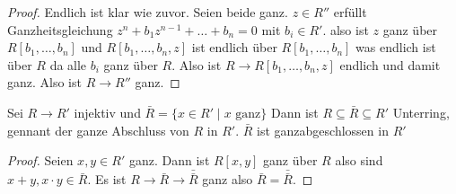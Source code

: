 \begin{proof}
	Endlich ist klar wie zuvor. Seien beide ganz.
	\(z\in R''\) erfüllt Ganzheitsgleichung \(z^n+b_1z^{n-1}+\dots+b_n=0\) mit \(b_i\in R'\).
	also ist \(z\) ganz über \(R[b_1,\dots,b_n]\) und \(R[b_1,\dots,b_n,z]\) ist endlich über \(R[b_1,\dots,b_n]\) was endlich ist über \(R\) da alle \(b_i\) ganz über \(R\). Also ist \(R\to R[b_1,\dots,b_n,z]\) endlich und damit ganz.
	Also ist \(R\to R''\) ganz.
\end{proof}
\begin{Lemma}
	
	Sei \(R\to R'\) injektiv und \(\bar R=\{x\in R'\mid x \text{ ganz}\}\) Dann ist \(R\subseteq \bar R\subseteq R'\) Unterring, gennant der ganze Abschluss von \(R\) in \(R'\). \(\bar R\) ist ganzabgeschlossen in \(R'\)
\end{Lemma}
\begin{proof}
	Seien \(x,y\in R'\) ganz. Dann ist \(R[x,y]\) ganz über \(R\) also sind \(x+y,x\cdot y\in \bar R\). Es ist \(R\to \bar R\to \bar{\bar R}\) ganz also \(\bar R=\bar{\bar R}\).
\end{proof}
